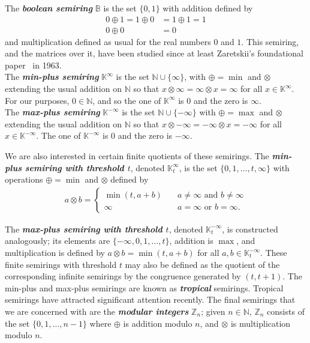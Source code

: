 \documentclass[11pt]{article}
\newcommand{\defn}[1]{\textbf{\textit{#1}}}
\numberwithin{equation}{section}
\newcommand{\B}{\mathbb{B}}
\newcommand{\N}{\mathbb{N}}
\newcommand{\Z}{\mathbb{Z}}
\newcommand{\K}{\mathbb{K}}
\begin{document}
The \defn{boolean semiring} $\B$ is the set $\{0, 1\}$ with addition defined by 
\begin{align*}
  0 \oplus 1 = 1 \oplus 0 &= 1 \oplus 1 = 1 \\
  0 \oplus 0 &= 0
\end{align*}
and multiplication defined as usual for the real numbers $0$ and $1$. This
semiring, and the matrices over it, have been studied since at least Zaretskii's
foundational paper~\cite{Zaretskii1963aa} in 1963. \\

The \defn{min-plus semiring} $\K^{\infty}$ is the set $\N \cup \{\infty\}$, with
$\oplus = \min$ and $\otimes$ extending the usual addition on $\N$ so that
$x\otimes\infty = \infty\otimes x = \infty$ for all $x \in \K^{\infty}$. For our
purposes, $0 \in \N$, and so the one of $\K^{\infty}$ is $0$ and the zero is
$\infty$. \\ 
The \defn{max-plus semiring} $\K^{-\infty}$ is the set $\N \cup \{-\infty\}$ with
$\oplus = \max$ and $\otimes$ extending the usual addition on $\N$ so that
$x\otimes-\infty = -\infty\otimes x = -\infty$ for all $x \in \K^{-\infty}$. The
one of $\K^{-\infty}$ is $0$ and the zero is $-\infty$.

We are also interested in certain finite quotients of these semirings. The
\defn{min-plus semiring with threshold $t$}, denoted $\K^{\infty}_t$, is the set
$\{0, 1, \ldots, t, \infty\}$ with operations $\oplus = \min$ and $\otimes$
defined by
\begin{align*}
  a \otimes b = \begin{cases}
    \min(t, a + b) \quad &\text{$a \neq \infty$ and $b \neq \infty$} \\
    \infty \quad &\text{$a = \infty$ or $b = \infty$}.
  \end{cases}
\end{align*}

The \defn{max-plus semiring with threshold $t$}, denoted $\K^{-\infty}_t$, is
constructed analogously; its elements are $\{-\infty, 0, 1, \ldots, t\}$,
addition is $\max$, and multiplication is defined by $a \otimes b = \min(t, a +
b)$ for all $a, b \in \K^{-\infty}_t$.
These finite semirings with threshold $t$ may also be defined as the quotient of
the corresponding infinite semirings by the congruence generated by $(t, t +
1)$.
The min-plus and max-plus semirings are known as \defn{tropical} semirings.
Tropical semirings have attracted significant attention recently.
The final semirings that we are concerned with are the \defn{modular integers}
$\Z_n$; given $n \in \N$, $\Z_n$ consists of the set $\{0, 1, \ldots, n - 1\}$
where $\oplus$ is addition modulo $n$, and $\otimes$ is multiplication modulo
$n$.
\end{document}
